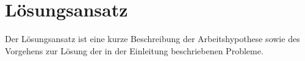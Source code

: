 \chapter{Lösungsansatz}\label{ch:approach}
Der Lösungsansatz ist eine kurze Beschreibung der Arbeitshypothese sowie des Vorgehens zur Lösung der in der Einleitung beschriebenen Probleme.
